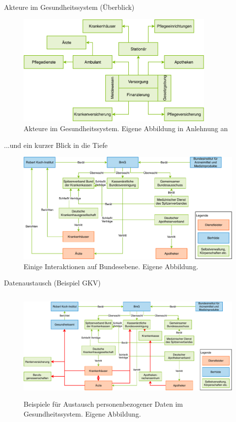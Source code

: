 \documentclass[aspectratio=169,t]{beamer}
\begin{document}
\begin{frame}{Akteure im Gesundheitssystem (Überblick)}
   \begin{figure}[h!]
    \includegraphics[height=5.5cm]{Bilder/Gesundheitssystem.pdf}
     \caption{Akteure im Gesundheitssystem. Eigene Abbildung in Anlehnung an \cite{SmartHealth}}
   \end{figure}
\end{frame}

\begin{frame}{...und ein kurzer Blick in die Tiefe}
   \begin{figure}[h!]
    \includegraphics[height=5.5cm, right]{Bilder/GesundheitssystemAkteureBund.pdf}
     \caption{Einige Interaktionen auf Bundesebene. Eigene Abbildung.}
   \end{figure}
\end{frame}

\begin{frame}{Datenaustausch (Beispiel GKV)}
   \begin{figure}[h!]
    \includegraphics[height=5.5cm, right]{Bilder/DatenfluesseGesundheitssystem.pdf}
     \caption{Beispiele für Austausch personenbezogener Daten im Gesundheitssystem. Eigene Abbildung.}
   \end{figure}
\end{frame}
\end{document}
